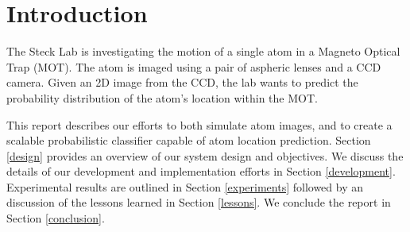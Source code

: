 \section{Introduction}

The Steck Lab is investigating the motion of a single atom in a Magneto Optical Trap (MOT).  The atom is imaged using a pair of aspheric lenses and a CCD camera.  Given an 2D image from the CCD, the lab wants to predict the probability distribution of the atom's location within the MOT.

This report describes our efforts to both simulate atom images, and to create a scalable probabilistic classifier capable of atom location prediction.  Section \ref{design} provides an overview of our system design and objectives.  We discuss the details of our development and implementation efforts in Section \ref{development}.  Experimental results are outlined in Section \ref{experiments} followed by an discussion of the lessons learned in Section \ref{lessons}. We conclude the report in Section \ref{conclusion}.
